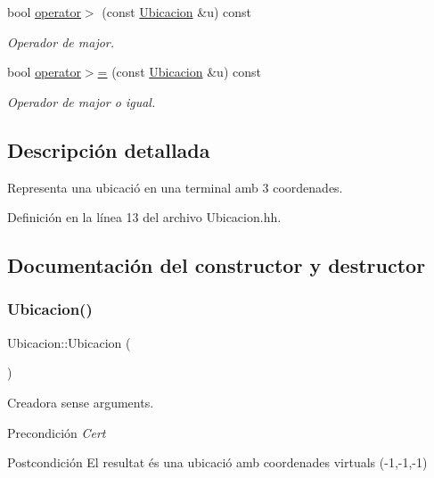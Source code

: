 \begin{DoxyCompactItemize}
bool \hyperlink{class_ubicacion_abde3b350c4f55f59964fabbc17ed164f}{operator$>$} (const \hyperlink{class_ubicacion}{Ubicacion} \&u) const
\begin{DoxyCompactList}\small\item\em Operador de major. \end{DoxyCompactList}\item 
bool \hyperlink{class_ubicacion_a0ea3b04b8b0ef5a3482049d3ddf63f3b}{operator$>$=} (const \hyperlink{class_ubicacion}{Ubicacion} \&u) const
\begin{DoxyCompactList}\small\item\em Operador de major o igual. \end{DoxyCompactList}\end{DoxyCompactItemize}


\subsection{Descripción detallada}
Representa una ubicació en una terminal amb 3 coordenades. 

Definición en la línea 13 del archivo Ubicacion.\+hh.



\subsection{Documentación del constructor y destructor}
\mbox{\label{class_ubicacion_a9014ea9ce9297b951a07a668a5fb7cc4}} 
\subsubsection{\texorpdfstring{Ubicacion()}{Ubicacion()}\hspace{0.1cm}{\footnotesize\ttfamily [1/3]}}
{\footnotesize\ttfamily Ubicacion\+::\+Ubicacion (\begin{DoxyParamCaption}{ }\end{DoxyParamCaption})}



Creadora sense arguments. 

\begin{DoxyPrecond}{Precondición}
{\itshape Cert} 
\end{DoxyPrecond}
\begin{DoxyPostcond}{Postcondición}
El resultat és una ubicació amb coordenades virtuals (-\/1,-\/1,-\/1) 
\end{DoxyPostcond}
\mbox{\label{class_ubicacion_a423ae49933ff18f187e1f034d295f4c1}} 
